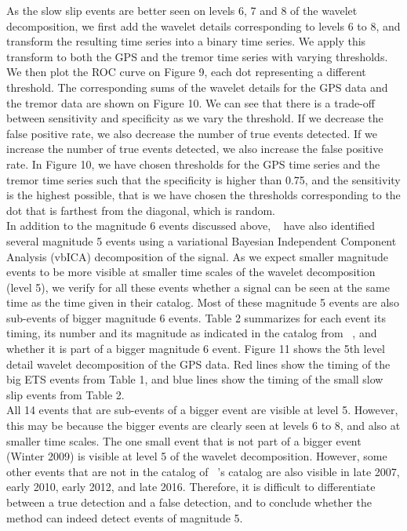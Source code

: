 \documentclass{article}
\begin{document}
As the slow slip events are better seen on levels 6, 7 and 8 of the wavelet decomposition, we first add the wavelet details corresponding to levels 6 to 8, and transform the resulting time series into a binary time series. We apply this transform to both the GPS and the tremor time series with varying thresholds. We then plot the ROC curve on Figure 9, each dot representing a different threshold. The corresponding sums of the wavelet details for the GPS data and the tremor data are shown on Figure 10. We can see that there is a trade-off between sensitivity and specificity as we vary the threshold. If we decrease the false positive rate, we also decrease the number of true events detected. If we increase the number of true events detected, we also increase the false positive rate. In Figure 10, we have chosen thresholds for the GPS time series and the tremor time series such that the specificity is higher than 0.75, and the sensitivity is the highest possible, that is we have chosen the thresholds corresponding to the dot that is farthest from the diagonal, which is random. \\

In addition to the magnitude 6 events discussed above,  ~\citet{MIC_2019} have also identified several magnitude 5 events using a variational Bayesian Independent Component Analysis (vbICA) decomposition of the signal. As we expect smaller magnitude events to be more visible at smaller time scales of the wavelet decomposition (level 5), we verify for all these events whether a signal can be seen at the same time as the time given in their catalog. Most of these magnitude 5 events are also sub-events of bigger magnitude 6 events. Table 2 summarizes for each event its timing, its number and its magnitude as indicated in the catalog from ~\citet{MIC_2019}, and whether it is part of a bigger magnitude 6 event. Figure 11 shows the 5th level detail wavelet decomposition of the GPS data. Red lines show the timing of the big ETS events from Table 1, and blue lines show the timing of the small slow slip events from Table 2. \\

All 14 events that are sub-events of a bigger event are visible at level 5. However, this may be because the bigger events are clearly seen at levels 6 to 8, and also at smaller time scales. The one small event that is not part of a bigger event (Winter 2009) is visible at level 5 of the wavelet decomposition. However, some other events that are not in the catalog of ~\citet{MIC_2019}'s catalog are also visible in late 2007, early 2010, early 2012, and late 2016. Therefore, it is difficult to differentiate between a true detection and a false detection, and to conclude whether the method can indeed detect events of magnitude 5. \\
\end{document}
